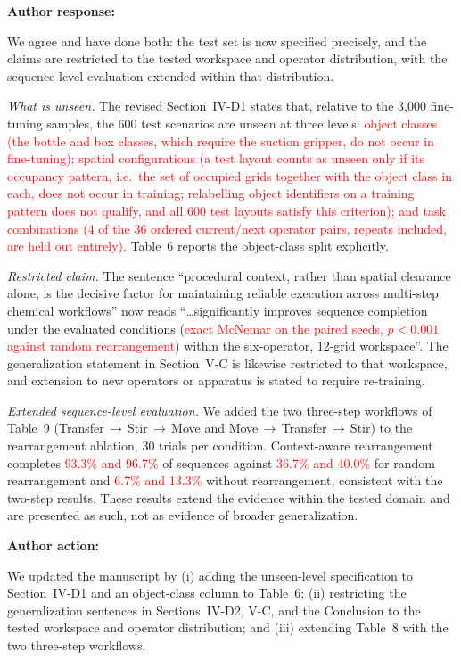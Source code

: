 \documentclass[11pt]{article}
\newcommand{\nd}[1]{\textcolor{red}{#1}}
\newenvironment{response}{\textbf{Author response:}\par\smallskip}{\par\medskip}
\newenvironment{action}{\textbf{Author action:}\par\smallskip}{\par\bigskip\noindent\hrulefill\par\bigskip}
\begin{document}
\begin{response}
We agree and have done both: the test set is now specified precisely, and the claims are restricted to the tested workspace and operator distribution, with the sequence-level evaluation extended within that distribution.

\emph{What is unseen.}
The revised Section~IV-D1 states that, relative to the 3,000 fine-tuning samples, the 600 test scenarios are unseen at three levels:
\nd{object classes (the bottle and box classes, which require the suction gripper, do not occur in fine-tuning);
spatial configurations (a test layout counts as unseen only if its occupancy pattern, i.e.\ the set of occupied grids together with the object class in each, does not occur in training; relabelling object identifiers on a training pattern does not qualify, and all 600 test layouts satisfy this criterion);
and task combinations (4 of the 36 ordered current/next operator pairs, repeats included, are held out entirely).}
Table~6 reports the object-class split explicitly.

\emph{Restricted claim.}
The sentence ``procedural context, rather than spatial clearance alone, is the decisive factor for maintaining reliable execution across multi-step chemical workflows'' now reads ``\ldots significantly improves sequence completion under the evaluated conditions (\nd{exact McNemar on the paired seeds, $p < 0.001$ against random rearrangement}) within the six-operator, 12-grid workspace''.
The generalization statement in Section~V-C is likewise restricted to that workspace, and extension to new operators or apparatus is stated to require re-training.

\emph{Extended sequence-level evaluation.}
We added the two three-step workflows of Table~9 (Transfer\,$\rightarrow$\,Stir\,$\rightarrow$\,Move and Move\,$\rightarrow$\,Transfer\,$\rightarrow$\,Stir) to the rearrangement ablation, 30 trials per condition.
Context-aware rearrangement completes \nd{93.3\% and 96.7\%} of sequences against \nd{36.7\% and 40.0\%} for random rearrangement and \nd{6.7\% and 13.3\%} without rearrangement, consistent with the two-step results.
These results extend the evidence within the tested domain and are presented as such, not as evidence of broader generalization.
\end{response}

\begin{action}
We updated the manuscript by
(i) adding the unseen-level specification to Section~IV-D1 and an object-class column to Table~6;
(ii) restricting the generalization sentences in Sections~IV-D2, V-C, and the Conclusion to the tested workspace and operator distribution;
and (iii) extending Table~8 with the two three-step workflows.
\end{action}
\end{document}
